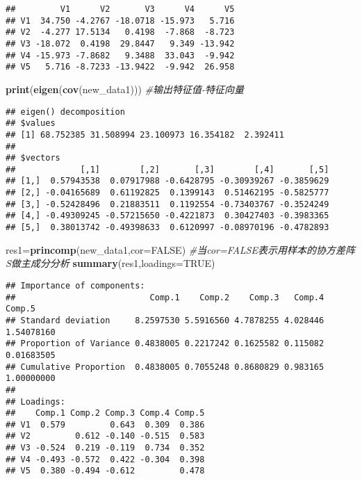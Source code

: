\documentclass[
]{article}
\newenvironment{Shaded}{\begin{snugshade}}{\end{snugshade}}
\newcommand{\CommentTok}[1]{\textcolor[rgb]{0.56,0.35,0.01}{\textit{#1}}}
\newcommand{\DataTypeTok}[1]{\textcolor[rgb]{0.13,0.29,0.53}{#1}}
\newcommand{\KeywordTok}[1]{\textcolor[rgb]{0.13,0.29,0.53}{\textbf{#1}}}
\newcommand{\NormalTok}[1]{#1}
\newcommand{\OtherTok}[1]{\textcolor[rgb]{0.56,0.35,0.01}{#1}}
\begin{document}
\begin{verbatim}
##         V1      V2       V3      V4      V5
## V1  34.750 -4.2767 -18.0718 -15.973   5.716
## V2  -4.277 17.5134   0.4198  -7.868  -8.723
## V3 -18.072  0.4198  29.8447   9.349 -13.942
## V4 -15.973 -7.8682   9.3488  33.043  -9.942
## V5   5.716 -8.7233 -13.9422  -9.942  26.958
\end{verbatim}

\begin{Shaded}
\begin{Highlighting}[]
\KeywordTok{print}\NormalTok{(}\KeywordTok{eigen}\NormalTok{(}\KeywordTok{cov}\NormalTok{(new_data1))) }\CommentTok{#输出特征值-特征向量}
\end{Highlighting}
\end{Shaded}

\begin{verbatim}
## eigen() decomposition
## $values
## [1] 68.752385 31.508994 23.100973 16.354182  2.392411
## 
## $vectors
##             [,1]        [,2]       [,3]        [,4]       [,5]
## [1,]  0.57943538  0.07917988 -0.6428795 -0.30939267 -0.3859629
## [2,] -0.04165689  0.61192825  0.1399143  0.51462195 -0.5825777
## [3,] -0.52428496  0.21883511  0.1192554 -0.73403767 -0.3524249
## [4,] -0.49309245 -0.57215650 -0.4221873  0.30427403 -0.3983365
## [5,]  0.38013742 -0.49398633  0.6120997 -0.08970196 -0.4782893
\end{verbatim}

\begin{Shaded}
\begin{Highlighting}[]
\NormalTok{res1=}\KeywordTok{princomp}\NormalTok{(new_data1,}\DataTypeTok{cor=}\OtherTok{FALSE}\NormalTok{) }\CommentTok{#当cor=FALSE表示用样本的协方差阵S做主成分分析}
\KeywordTok{summary}\NormalTok{(res1,}\DataTypeTok{loadings=}\OtherTok{TRUE}\NormalTok{)}
\end{Highlighting}
\end{Shaded}

\begin{verbatim}
## Importance of components:
##                           Comp.1    Comp.2    Comp.3   Comp.4     Comp.5
## Standard deviation     8.2597530 5.5916560 4.7878255 4.028446 1.54078160
## Proportion of Variance 0.4838005 0.2217242 0.1625582 0.115082 0.01683505
## Cumulative Proportion  0.4838005 0.7055248 0.8680829 0.983165 1.00000000
## 
## Loadings:
##    Comp.1 Comp.2 Comp.3 Comp.4 Comp.5
## V1  0.579         0.643  0.309  0.386
## V2         0.612 -0.140 -0.515  0.583
## V3 -0.524  0.219 -0.119  0.734  0.352
## V4 -0.493 -0.572  0.422 -0.304  0.398
## V5  0.380 -0.494 -0.612         0.478
\end{verbatim}
\end{document}
